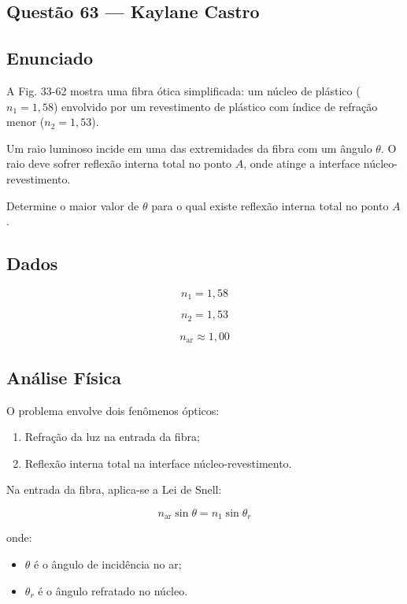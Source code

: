 \documentclass[12pt,a4paper]{article}
\begin{document}
\subsection{Questão 63 — Kaylane Castro}


\subsection*{Enunciado}

A Fig. 33-62 mostra uma fibra ótica simplificada: um núcleo de plástico ($n_1 = 1,58$) envolvido por um revestimento de plástico com índice de refração menor ($n_2 = 1,53$).

Um raio luminoso incide em uma das extremidades da fibra com um ângulo $\theta$. O raio deve sofrer reflexão interna total no ponto $A$, onde atinge a interface núcleo-revestimento.

Determine o maior valor de $\theta$ para o qual existe reflexão interna total no ponto $A$.


\subsection*{Dados}

\[
n_1 = 1,58
\]

\[
n_2 = 1,53
\]

\[
n_{\text{ar}} \approx 1,00
\]


\subsection*{Análise Física}

O problema envolve dois fenômenos ópticos:

\begin{enumerate}
    \item Refração da luz na entrada da fibra;
    \item Reflexão interna total na interface núcleo-revestimento.
\end{enumerate}

Na entrada da fibra, aplica-se a Lei de Snell:

\[
n_{\text{ar}}\sin\theta = n_1\sin\theta_r
\]

onde:

\begin{itemize}
    \item $\theta$ é o ângulo de incidência no ar;
    \item $\theta_r$ é o ângulo refratado no núcleo.
\end{itemize}
\end{document}

